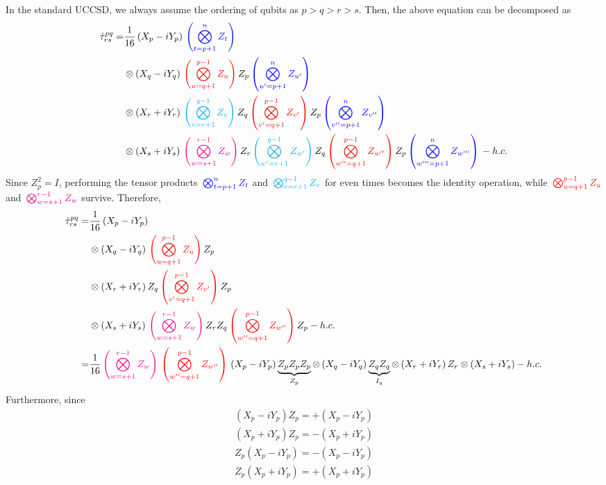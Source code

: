 \documentclass[prb,amsmath,amsfonts,amssymb]{revtex4}
\newcommand{\blue}{\color{blue}{}}
\newcommand{\red}{\color{red}{}}
\newcommand{\black}{\color{black}{}}
\newcommand{\cyan}{\color{cyan}{}}
\newcommand{\magenta}{\color{magenta}{}}
\begin{document}
In the standard UCCSD, we always assume the ordering of qubits as $p>q>r>s$. Then, the above equation can be decomposed as
\begin{align}
	\hat \tau_{rs}^{pq} = & \frac{1}{16}\left(X_p - i Y_p\right)\blue\left(\bigotimes_{t=p+1}^{n}Z_t \right)	\nonumber\\
	& \otimes 
	 \left(X_q - i Y_q\right)
\red	 \left(\bigotimes_{u=q+1}^{p-1}Z_u \right)
\black	  Z_p
	   \blue\left(\bigotimes_{u'=p+1}^{n}Z_{u'} \right)\nonumber\\
	&\otimes
\left(X_r + i Y_r\right)
\cyan\left(\bigotimes_{v=r+1}^{q-1}Z_v \right)
\black Z_q
\red \left(\bigotimes_{v'=q+1}^{p-1}Z_{v'} \right)
\black Z_p
\blue\left(\bigotimes_{v''=p+1}^{n}Z_{v''} \right)
	\nonumber\\	
	&\otimes
\left(X_s + i Y_s\right)
\magenta \left(\bigotimes_{w=s+1}^{r-1} Z_w \right)
\black Z_r
\cyan \left(\bigotimes_{w'=r+1}^{q-1} Z_{w'} \right)
\black Z_q
\red \left(\bigotimes_{w''=q+1}^{p-1} Z_{w''} \right)
\black Z_p
\blue\left(\bigotimes_{w'''=p+1}^{n} Z_{w'''} \right)
\black 
- h.c.
\end{align}
Since $Z_p^2 = I$, performing the tensor products $\blue\bigotimes_{t=p+1}^n Z_t$ and $\cyan\bigotimes_{v=r+1}^{q-1} Z_v$ for even times becomes the identity operation, while $\red\bigotimes_{u=q+1}^{p-1} Z_u$ and $\magenta\bigotimes_{w=s+1}^{r-1} Z_w$ survive. 
Therefore,
\begin{align}
	\hat \tau_{rs}^{pq} = & \frac{1}{16}\left(X_p - i Y_p\right)
		\nonumber\\
	& \otimes 
	 \left(X_q - i Y_q\right)
\red	 \left(\bigotimes_{u=q+1}^{p-1}Z_u \right)
\black	  Z_p
\nonumber\\
	&\otimes
	\left(X_r + i Y_r\right)
\black Z_q
\red \left(\bigotimes_{v'=q+1}^{p-1}Z_{v'} \right)
\black Z_p
	\nonumber\\	
	&\otimes
\left(X_s + i Y_s\right)
\magenta \left(\bigotimes_{w=s+1}^{r-1} Z_w \right)
\black Z_r
\black Z_q
\red \left(\bigotimes_{w''=q+1}^{p-1} Z_{w''} \right)
\black Z_p
\black 
- h.c.
\nonumber\\
= & \frac{1}{16} \magenta \left(\bigotimes_{w=s+1}^{r-1} Z_w \right)\red \left(\bigotimes_{w''=q+1}^{p-1} Z_{w''} \right) 
\black \left(X_p - i Y_p\right) \underbrace{Z_p Z_p Z_p}_{Z_p}
	\otimes 
	 \left(X_q - i Y_q\right) \underbrace{Z_q Z_q}_{I_q}
	\otimes
	\left(X_r + i Y_r\right) Z_r
	\otimes
\left(X_s + i Y_s\right)
- h.c.
\end{align}
Furthermore, since
\begin{subequations}
	\begin{align}
	(X_p-iY_p)Z_p = +(X_p-iY_p)\\
	(X_p+iY_p)Z_p = -(X_p+iY_p)\\
	Z_p(X_p-iY_p) = -(X_p-iY_p)\\
	Z_p(X_p+iY_p) = +(X_p+iY_p)
\end{align}
\label{eq:sigma_Z}
\end{subequations}
\end{document}
